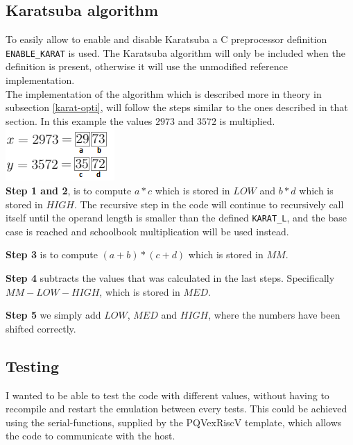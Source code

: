 \subsection{Karatsuba algorithm}
To easily allow to enable and disable Karatsuba a C preprocessor definition \texttt{ENABLE\_KARAT} is used. The Karatsuba algorithm will only be included when the definition is present, otherwise it will use the unmodified reference implementation.\medskip
\\
The implementation of the algorithm which is described more in theory in subsection \ref{karat-opti}, will follow the steps similar to the ones described in that section. In this example the values $2973$ and $3572$ is multiplied. \\
\includegraphics{report/images/karat-split.png}\\
\textbf{Step 1 and 2}, is to compute $a * c$ which is stored in $LOW$ and $b * d$ which is stored in $HIGH$. The recursive step in the code will continue to recursively call itself until the operand length is smaller than the defined \texttt{KARAT\_L}, and the base case is reached and schoolbook multiplication will be used instead.

\medskip
\textbf{Step 3} is to compute $(a + b) * (c + d)$ which is stored in $MM$.

\medskip
\textbf{Step 4} subtracts the values that was calculated in the last steps. Specifically $MM - LOW - HIGH$, which is stored in $MED$.

\medskip
\textbf{Step 5} we simply add $LOW$, $MED$ and $HIGH$, where the numbers have been shifted correctly.

\pagebreak
\subsection{Testing}
\label{sub-testing}
I wanted to be able to test the code with different values, without having to recompile and restart the emulation between every tests. This could be achieved using the serial-functions, supplied by the PQVexRiscV\cite{PQVexRiscV} template, which allows the code to communicate with the host.
